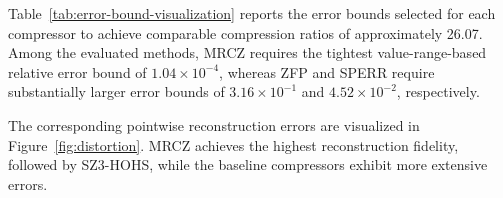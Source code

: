 Table~\ref{tab:error-bound-visualization} reports the error bounds selected for each compressor to achieve comparable compression ratios of approximately 26.07. Among the evaluated methods, MRCZ requires the tightest value-range-based relative error bound of $1.04\times10^{-4}$, whereas ZFP and SPERR require substantially larger error bounds of $3.16\times10^{-1}$ and $4.52\times10^{-2}$, respectively.

The corresponding pointwise reconstruction errors are visualized in Figure~\ref{fig:distortion}. MRCZ achieves the highest reconstruction fidelity, followed by SZ3-HOHS, while the baseline compressors exhibit more extensive errors.